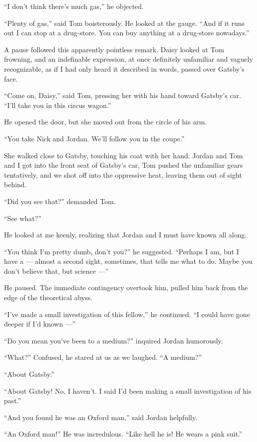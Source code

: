 \documentclass{znotebook}
\begin{document}
``I don't think there's much gas,'' he objected.

``Plenty of gas,'' said Tom boisterously. He looked at the gauge. ``And if it runs out I can stop at a drug-store. You can buy anything at a drug-store nowadays.''

A pause followed this apparently pointless remark. Daisy looked at Tom frowning, and an indefinable expression, at once definitely unfamiliar and vaguely recognizable, as if I had only heard it described in words, passed over Gatsby's face.

``Come on, Daisy,'' said Tom, pressing her with his hand toward Gatsby's car. ``I'll take you in this circus wagon.''

He opened the door, but she moved out from the circle of his arm.

``You take Nick and Jordan. We'll follow you in the coupe.''

She walked close to Gatsby, touching his coat with her hand. Jordan and Tom and I got into the front seat of Gatsby's car, Tom pushed the unfamiliar gears tentatively, and we shot off into the oppressive heat, leaving them out of sight behind.

``Did you see that?'' demanded Tom.

``See what?''

He looked at me keenly, realizing that Jordan and I must have known all along.

``You think I'm pretty dumb, don't you?'' he suggested. ``Perhaps I am, but I have a ---{} almost a second sight, sometimes, that tells me what to do. Maybe you don't believe that, but science ---''

He paused. The immediate contingency overtook him, pulled him back from the edge of the theoretical abyss.

``I've made a small investigation of this fellow,'' he continued. ``I could have gone deeper if I'd known ---''

``Do you mean you've been to a medium?'' inquired Jordan humorously.

``What?'' Confused, he stared at us as we laughed. ``A medium?''

``About Gatsby.''

``About Gatsby! No, I haven't. I said I'd been making a small investigation of his past.''

``And you found he was an Oxford man,'' said Jordan helpfully.

``An Oxford man!'' He was incredulous. ``Like hell he is! He wears a pink suit.''
\end{document}
